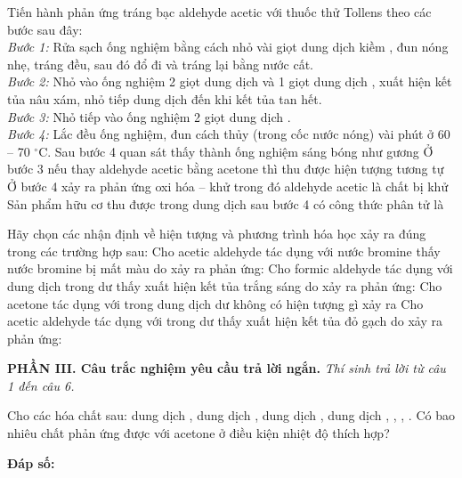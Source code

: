 \documentclass[12pt,a4paper]{article}
\begin{document}
\begin{ex}
Tiến hành phản ứng tráng bạc aldehyde acetic với thuốc thử Tollens theo các bước sau đây:\\
\textit{Bước 1:} Rửa sạch ống nghiệm bằng cách nhỏ vài giọt dung dịch kiềm , đun nóng nhẹ, tráng đều, sau đó đổ đi và tráng lại bằng nước cất.\\
\textit{Bước 2:} Nhỏ vào ống nghiệm 2 giọt dung dịch  và 1 giọt dung dịch , xuất hiện kết tủa nâu xám, nhỏ tiếp dung dịch  đến khi kết tủa tan hết.\\
\textit{Bước 3:} Nhỏ tiếp vào ống nghiệm 2 giọt dung dịch .\\
\textit{Bước 4:} Lắc đều ống nghiệm, đun cách thủy (trong cốc nước nóng) vài phút ở 60 -- 70 $^\circ$C.
\choiceTF
{Sau bước 4 quan sát thấy thành ống nghiệm sáng bóng như gương}
{Ở bước 3 nếu thay aldehyde acetic bằng acetone thì thu được hiện tượng tương tự}
{Ở bước 4 xảy ra phản ứng oxi hóa -- khử trong đó aldehyde acetic là chất bị khử}
{Sản phẩm hữu cơ thu được trong dung dịch sau bước 4 có công thức phân tử là }
\end{ex}

\begin{ex}
Hãy chọn các nhận định về hiện tượng và phương trình hóa học xảy ra đúng trong các trường hợp sau:
\choiceTF
{Cho acetic aldehyde tác dụng với nước bromine thấy nước bromine bị mất màu do xảy ra phản ứng: }
{Cho formic aldehyde tác dụng với dung dịch  trong  dư thấy xuất hiện kết tủa trắng sáng do xảy ra phản ứng: }
{Cho acetone tác dụng với  trong dung dịch  dư không có hiện tượng gì xảy ra}
{Cho acetic aldehyde tác dụng với  trong  dư thấy xuất hiện kết tủa đỏ gạch do xảy ra phản ứng: }
\end{ex}

\vspace{0.3cm}
\noindent\textbf{\large PHẦN III. Câu trắc nghiệm yêu cầu trả lời ngắn.}
\textit{Thí sinh trả lời từ câu 1 đến câu 6.}
\vspace{0.2cm}

\begin{ex}
Cho các hóa chất sau: dung dịch , dung dịch , dung dịch , dung dịch , , , . Có bao nhiêu chất phản ứng được với acetone ở điều kiện nhiệt độ thích hợp?

\vspace{0.2cm}
\noindent\textbf{Đáp số:} \dotfill
\end{ex}
\end{document}
